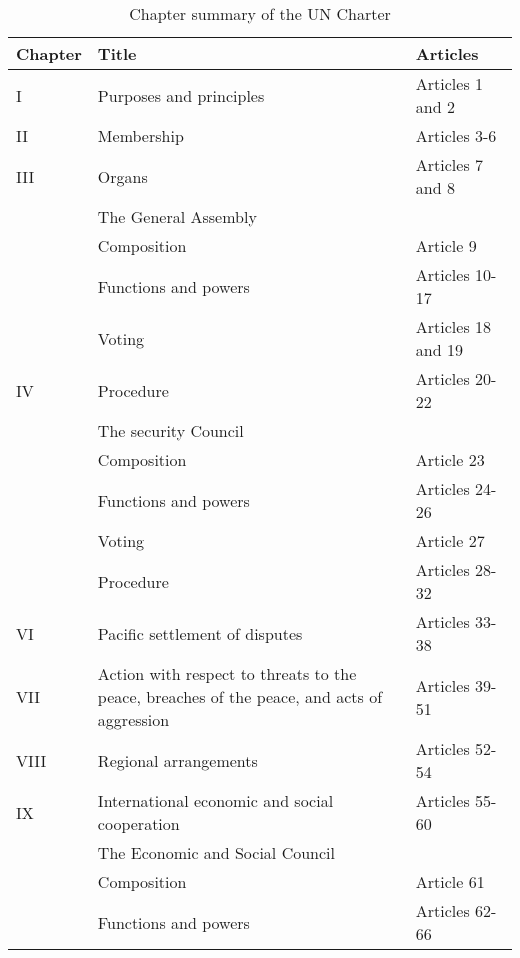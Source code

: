 \documentclass[
  openany]{book}
\begin{document}
\begingroup\fontsize{8}{10}\selectfont

\begin{longtable}[t]{l>{\raggedright\arraybackslash}p{20em}>{\raggedright\arraybackslash}p{10em}}
\caption{\label{tab:unnamed-chunk-2}Chapter summary of the UN Charter}\\
\toprule
Chapter & Title & Articles\\
\midrule
\rowcolor{gray!6}  I & Purposes and principles & Articles 1 and 2\\
\cmidrule{1-3}
II & Membership & Articles 3-6\\
\cmidrule{1-3}
\rowcolor{gray!6}  III & Organs & Articles 7 and 8\\
\cmidrule{1-3}
 & The General Assembly & \\
\cmidrule{2-3}
\rowcolor{gray!6}   & Composition & Article 9\\
\cmidrule{2-3}
 & Functions and powers & Articles 10-17\\
\cmidrule{2-3}
\rowcolor{gray!6}   & Voting & Articles 18 and 19\\
\cmidrule{2-3}
\multirow{-5}{*}{\raggedright\arraybackslash IV} & Procedure & Articles 20-22\\
\cmidrule{1-3}
\rowcolor{gray!6}   & The security Council & \\
\cmidrule{2-3}
 & Composition & Article 23\\
\cmidrule{2-3}
\rowcolor{gray!6}   & Functions and powers & Articles 24-26\\
\cmidrule{2-3}
 & Voting & Article 27\\
\cmidrule{2-3}
\rowcolor{gray!6}  \multirow{-5}{*}{\raggedright\arraybackslash V} & Procedure & Articles 28-32\\
\cmidrule{1-3}
VI & Pacific settlement of disputes & Articles 33-38\\
\cmidrule{1-3}
\rowcolor{gray!6}  VII & Action with respect to threats to the peace, breaches of the peace, and acts of aggression & Articles 39-51\\
\cmidrule{1-3}
VIII & Regional arrangements & Articles 52-54\\
\cmidrule{1-3}
\rowcolor{gray!6}  IX & International economic and social cooperation & Articles 55-60\\
\cmidrule{1-3}
 & The Economic and Social Council & \\
\cmidrule{2-3}
\rowcolor{gray!6}   & Composition & Article 61\\
\cmidrule{2-3}
 & Functions and powers & Articles 62-66\\

\end{longtable}
\end{document}
